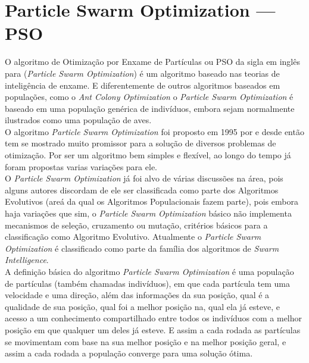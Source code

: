 \section{Particle Swarm Optimization — PSO}
O algoritmo de Otimização por Enxame de Partículas ou PSO da sigla em inglês para (\textit{Particle Swarm Optimization}) é um algoritmo baseado nas teorias de inteligência de enxame. E diferentemente de outros algoritmos baseados em populações, como o \textit{Ant Colony Optimization} o \textit{Particle Swarm Optimization} é baseado em uma população genérica de indivíduos, embora sejam normalmente ilustrados como uma população de aves.\\
\indent O algoritmo \textit{Particle Swarm Optimization} foi proposto em 1995 por \cite{Kennedy1995} e desde então tem se mostrado muito promissor para a solução de diversos problemas de otimização. Por ser um algoritmo bem simples e flexível, ao longo do tempo já foram propostas varias variações para ele.\\
%
\indent O \textit{Particle Swarm Optimization} já foi alvo de várias discussões na área, pois alguns autores discordam de ele ser classificada como parte dos Algoritmos Evolutivos (areá da qual os Algoritmos Populacionais fazem parte), pois embora haja variações que sim, o \textit{Particle Swarm Optimization} básico não implementa mecanismos de seleção, cruzamento ou mutação, critérios básicos para a classificação como Algoritmo Evolutivo.
%
Atualmente o \textit{Particle Swarm Optimization} é classificado como parte da família dos algoritmos de \textit{Swarm Intelligence}.\\
\indent A definição básica do algoritmo \textit{Particle Swarm Optimization} é uma população de partículas (também chamadas indivíduos), em que cada partícula tem uma velocidade e uma direção, além das informações da sua posição, qual é a qualidade de sua posição, qual foi a melhor posição na, qual ela já esteve, e acesso a um conhecimento compartilhado entre todos os indivíduos com a melhor posição em que qualquer um deles já esteve. E assim a cada rodada as partículas se movimentam com base na sua melhor posição e na melhor posição geral, e assim a cada rodada a população converge para uma solução ótima.\\
